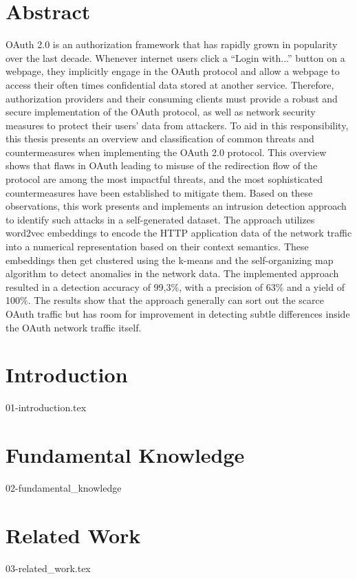 \documentclass[
    fontsize=12pt,
    headings=small,
    parskip=half,           %
    bibliography=totoc,
    numbers=noenddot,       %
    open=any,               %
	final                   %
    ]{scrreprt}
\begin{document}
\chapter*{Abstract}
OAuth 2.0 is an authorization framework that has rapidly grown in popularity over the last decade. Whenever internet users click a ``Login with...'' button on a webpage, they implicitly engage in the OAuth protocol and allow a webpage to access their often times confidential data stored at another service. Therefore, authorization providers and their consuming clients must provide a robust and secure implementation of the OAuth protocol, as well as network security measures to protect their users' data from attackers. To aid in this responsibility, this thesis presents an overview and classification of common threats and countermeasures when implementing the OAuth 2.0 protocol. This overview shows that flaws in OAuth leading to misuse of the redirection flow of the protocol are among the most impactful threats, and the most sophisticated countermeasures have been established to mitigate them. Based on these observations, this work presents and implements an intrusion detection approach to identify such attacks in a self-generated dataset. The approach utilizes word2vec embeddings to encode the HTTP application data of the network traffic into a numerical representation based on their context semantics. These embeddings then get clustered using the k-means and the self-organizing map algorithm to detect anomalies in the network data. The implemented approach resulted in a detection accuracy of 99,3\%, with a precision of 63\% and a yield of 100\%. The results show that the approach generally can sort out the scarce OAuth traffic but has room for improvement in detecting subtle differences inside the OAuth network traffic itself.

\tableofcontents

\chapter{Introduction}
\label{chap:introduction}
{01-introduction.tex}

\chapter{Fundamental Knowledge}
\label{chap:fundamental_knowledge}
{02-fundamental_knowledge}

\chapter{Related Work}
\label{chap:related_work}
{03-related_work.tex}
\end{document}

